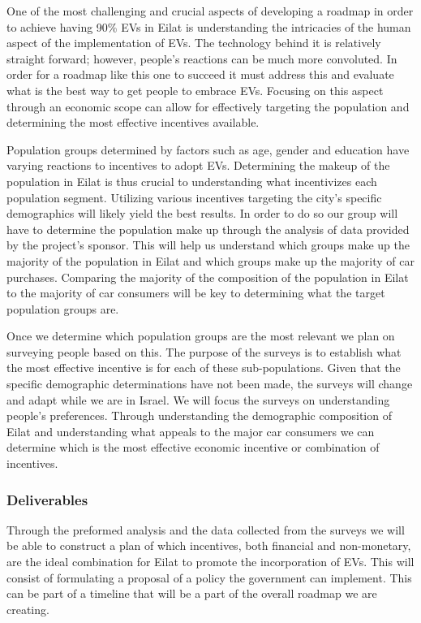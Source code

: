 \documentclass[12pt]{article}                         %
\begin{document}
One of the most challenging and crucial aspects of developing a roadmap in order to achieve having 90\% EVs in Eilat is understanding the intricacies of the human aspect of the implementation of EVs. The technology behind it is relatively straight forward; however, people’s reactions can be much more convoluted. In order for a roadmap like this one to succeed it must address this and evaluate what is the best way to get people to embrace EVs. Focusing on this aspect through an economic scope can allow for effectively targeting the population and determining the most effective incentives available. 

Population groups determined by factors such as age, gender and education have varying reactions to incentives to adopt EVs. Determining the makeup of the population in Eilat is thus crucial to understanding what incentivizes each population segment. Utilizing various incentives targeting the city’s specific demographics will likely yield the best results. In order to do so our group will have to determine the population make up through the analysis of data provided by the project’s sponsor. This will help us understand which groups make up the majority of the population in Eilat and which groups make up the majority of car purchases. Comparing the majority of the composition of the population in Eilat to the majority of car consumers will be key to determining what the target population groups are.

Once we determine which population groups are the most relevant we plan on surveying people based on this. The purpose of the surveys is to establish what the most effective incentive is for each of these sub-populations. Given that the specific demographic determinations have not been made, the surveys will change and adapt while we are in Israel. We will focus the surveys on understanding  people's preferences. Through understanding the demographic composition of Eilat and understanding what appeals to the major car consumers we can determine which is the most effective economic incentive or combination of incentives. 

\subsubsection{Deliverables}
Through the preformed analysis and the data collected from the surveys we will be able to construct a plan of which incentives, both financial and non-monetary, are the ideal combination for Eilat to promote the incorporation of EVs. This will consist of formulating a proposal of a policy the government can implement. This can be part of a timeline that will be a part of the overall roadmap we are creating. 
\end{document}
